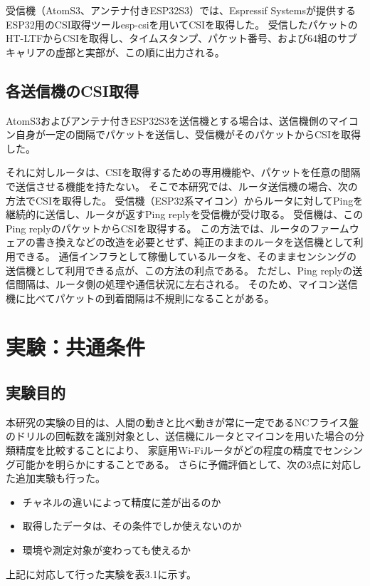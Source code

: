 \documentclass[uplatex, 12pt]{ujbook}
\begin{document}
受信機（AtomS3、アンテナ付きESP32S3）では、Espressif Systemsが提供するESP32用のCSI取得ツールesp-csi\cite{espcsi}を用いてCSIを取得した。
受信したパケットのHT-LTFからCSIを取得し、タイムスタンプ、パケット番号、および64組のサブキャリアの虚部と実部が、この順に出力される。

\section{各送信機のCSI取得}
AtomS3およびアンテナ付きESP32S3を送信機とする場合は、送信機側のマイコン自身が一定の間隔でパケットを送信し、受信機がそのパケットからCSIを取得した。

それに対しルータは、CSIを取得するための専用機能や、パケットを任意の間隔で送信させる機能を持たない。
そこで本研究では、ルータ送信機の場合、次の方法でCSIを取得した。
受信機（ESP32系マイコン）からルータに対してPingを継続的に送信し、ルータが返すPing replyを受信機が受け取る。
受信機は、このPing replyのパケットからCSIを取得する。
この方法では、ルータのファームウェアの書き換えなどの改造を必要とせず、純正のままのルータを送信機として利用できる。
通信インフラとして稼働しているルータを、そのままセンシングの送信機として利用できる点が、この方法の利点である。
ただし、Ping replyの送信間隔は、ルータ側の処理や通信状況に左右される。
そのため、マイコン送信機に比べてパケットの到着間隔は不規則になることがある。

\chapter{実験：共通条件}
\section{実験目的}
本研究の実験の目的は、人間の動きと比べ動きが常に一定であるNCフライス盤のドリルの回転数を識別対象とし、送信機にルータとマイコンを用いた場合の分類精度を比較することにより、
家庭用Wi-Fiルータがどの程度の精度でセンシング可能かを明らかにすることである。
さらに予備評価として、次の3点に対応した追加実験も行った。

\begin{itemize}
  \item チャネルの違いによって精度に差が出るのか
  \item 取得したデータは、その条件でしか使えないのか
  \item 環境や測定対象が変わっても使えるか
\end{itemize}
上記に対応して行った実験を表3.1に示す。
\end{document}
